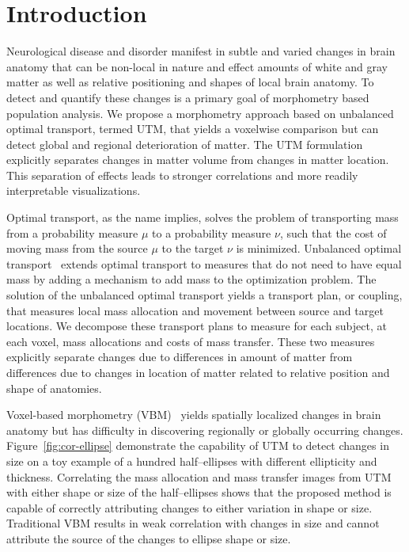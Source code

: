 \documentclass{llncs}
\begin{document}
\section{Introduction}
Neurological disease and disorder manifest in subtle and varied changes in
brain anatomy that can be non-local in nature and effect amounts of white and
gray matter as well as relative positioning and shapes of local brain anatomy.
To detect and quantify these changes is a primary goal of morphometry based
population analysis. We propose a morphometry approach based on unbalanced
optimal transport, termed UTM, that yields a voxelwise comparison but can
detect global and regional deterioration of matter. The UTM formulation
explicitly separates changes in matter volume from changes in matter location.
This separation of effects leads to stronger correlations and more readily
interpretable visualizations. 

Optimal transport, as the name implies, solves the problem of transporting mass
from a probability measure $\mu$ to a probability measure $\nu$, such that the
cost of moving mass from the source $\mu$ to the target $\nu$ is minimized.
Unbalanced optimal transport~\cite{guittet2002extended,benamou2003numerical}
extends optimal transport to measures that do not need to have equal mass by
adding a mechanism to add mass to the optimization problem. The solution of the
unbalanced optimal transport yields a transport plan, or coupling, that
measures local mass allocation and movement between source and target
locations. We decompose these transport plans to measure for each subject, at
each voxel, mass allocations and costs of mass transfer. These two measures
explicitly separate changes due to differences in amount of matter from
differences due to changes in location of matter related to relative position
and shape of anatomies. 

Voxel-based morphometry (VBM)~\cite{ashburner2000voxel} yields spatially
localized changes in brain anatomy but has difficulty in discovering regionally
or globally occurring changes. Figure~\ref{fig:cor-ellipse} demonstrate the
capability of UTM to detect changes in size on a toy example of a hundred
half--ellipses with different ellipticity and thickness.  Correlating the
mass allocation and mass transfer images from UTM with either shape or size of
the half--ellipses shows that the proposed method is capable of correctly
attributing changes to either variation in shape or size.  Traditional VBM
results in weak correlation with changes in size and cannot attribute the
source of the changes to ellipse shape or size.
\end{document}
